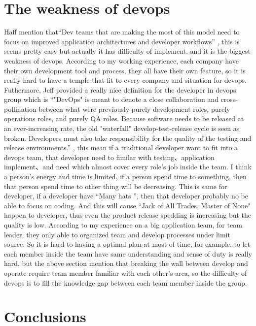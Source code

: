 \documentclass[sigconf]{acmart}
\begin{document}
\section{The weakness of devops}

Haff mention that``Dev teams that are making the most of this model need to focus on improved application architectures and developer workflows'' \cite{devops:05}, this is seems pretty easy but actually it has difficulty of implement, and it is the biggest weakness of devops. According to my working experience, each company have their own development tool and process, they all have their own feature, so it is really hard to have a temple that fit to every company and situation for devops. Futhermore, Jeff provided a really nice definition for the developer in devops group which is ``"DevOps" is meant to denote a close collaboration and cross-pollination between what were previously purely development roles, purely operations roles, and purely QA roles. Because software needs to be released at an ever-increasing rate, the old "waterfall" develop-test-release cycle is seen as broken. Developers must also take responsibility for the quality of the testing and release environments.'' \cite{kill}, this mean if a traditional developer want to fit into a devops team, that developer need to fimilar with testing、application implement、and need which almost cover every role's job inside the team. I think a person's energy and time is limited, if a person spend time to something, then that person spend time to other thing will be decreasing. This is same for developer, if a developer have ``Many hats ''\cite{kill}, then that developer  probably no be able to focus on coding. And this will cause ``Jack of All Trades, Master of None" \cite{kill} happen to developer, thus even the product release spedding is  increasing but the quality is low. According to my experience on a big application team, for team leader, they only able to organized team and develop processes under limit source. So it is hard to having a optimal plan at most of time, for example, to let each member inside the team have same understanding and sense of duty is really hard, but the above section mention that breaking the wall between develop and operate require team member familiar with each other's area, so the difficulty of devops is to fill the knowledge gap between each team member inside the group. 

\section{Conclusions}
\end{document}
